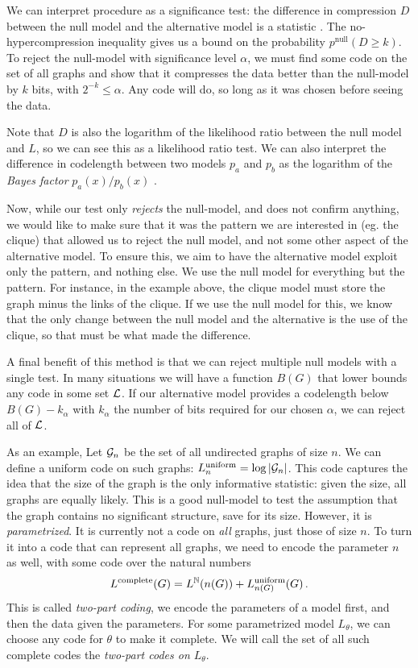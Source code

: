 We can interpret procedure as a significance test: the difference in compression $D$ between the null model and the alternative model is a statistic \cite[Example~14.2]{grunwald2007minimum}. The no-hypercompression inequality gives us a bound on the probability $p^\text{null}(D \geq k)$. To reject the null-model with significance level $\alpha$, we must find some code on the set of all graphs and show that it compresses the data better than the null-model by $k$ bits, with $2^{-k} \leq \alpha$. Any code will do, so long as it was chosen before seeing the data.

Note that $D$ is also the logarithm of the likelihood ratio between the null model and $L$, so we can see this as a likelihood ratio test. We can also interpret the difference in codelength between two models $p_a$ and $p_b$  as the logarithm of the \emph{Bayes factor} $p_a(x)/p_b(x)$ \cite[Section~14.2.3]{grunwald2007minimum}. 

Now, while our test  only \emph{rejects} the null-model, and does not confirm anything, we would like to make sure that it was the pattern we are interested in (eg. the clique) that allowed us to reject the null model, and not some other aspect of the alternative model. To ensure this, we aim to have the alternative model exploit only the pattern, and nothing else. We use the null model for everything but the pattern. For instance, in the example above, the clique model must store the graph minus the links of the clique. If we use the null model for this, we know that the only change between the null model and the alternative is the use of the clique, so that must be what made the difference.

A final benefit of this method is that we can reject multiple null models with a single test. In many situations we will have a function $B(G)$ that lower bounds any code in some set $\cal L$. If our alternative model provides a codelength below $B(G) - k_\alpha$ with $k_\alpha$ the number of bits required for our chosen $\alpha$, we can reject all of $\cal L$.

As an example, Let ${\mathcal G}_n$ be the set of all undirected graphs of size $n$. We can define a uniform code on such graphs: $L^\text{uniform}_n = \log |{\mathcal G}_n|$. This code captures the idea that the size of the graph is the only informative statistic: given the size, all graphs  are equally likely. This is a good null-model to test the assumption that the graph contains no significant structure, save for its size. However, it is \emph{parametrized}. It is currently not a code on \emph{all} graphs, just those of size $n$. To turn it into a code that can represent all graphs, we need to encode the parameter $n$ as well, with some code over the natural numbers
\[
L^\text{complete}(G) = L^{\mathbb N}(n(G)) + L^\text{uniform}_{n(G)}(G) \,\text{.}
\]
This is called \emph{two-part coding}, we encode the parameters of a model first, and then the data given the parameters. For some parametrized model $L_\theta$, we can choose any code for $\theta$ to make it complete. We will call the set of all such complete codes the \emph{two-part codes on $L_\theta$}. 

